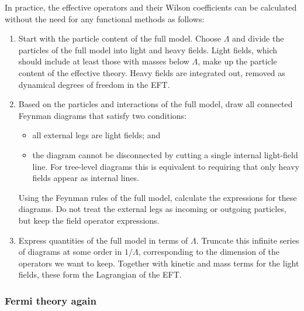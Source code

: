 In practice, the effective operators and their Wilson coefficients can
be calculated without the need for any functional methods as follows:
%
\begin{enumerate}
\item Start with the particle content of the full model. Choose
  $\Lambda$ and divide the particles of the full model into light and
  heavy fields. Light fields, which should include at least those with
  masses below $\Lambda$, make up the particle content of the
  effective theory. Heavy fields are integrated out, \ie removed as
  dynamical degrees of freedom in the EFT.
%
\item Based on the particles and interactions of the full model, draw
  all connected Feynman diagrams that satisfy two conditions:
%
  \begin{itemize}
    \item all external legs are light fields; and
    \item the diagram cannot be disconnected by cutting a single
      internal light-field line. For tree-level diagrams this is
      equivalent to requiring that only heavy fields appear as
      internal lines.
  \end{itemize}
%
  Using the Feynman rules of the full model, calculate the expressions
  for these diagrams. Do not treat the external legs as incoming or
  outgoing particles, but keep the field operator expressions.
%
\item Express quantities of the full model in terms of
  $\Lambda$. Truncate this infinite series of diagrams at some order
  in $1/\Lambda$, corresponding to the dimension of the operators we
  want to keep. Together with kinetic and mass terms for the light
  fields, these form the Lagrangian of the EFT.
\end{enumerate}



  
\subsubsection{Fermi theory again}

